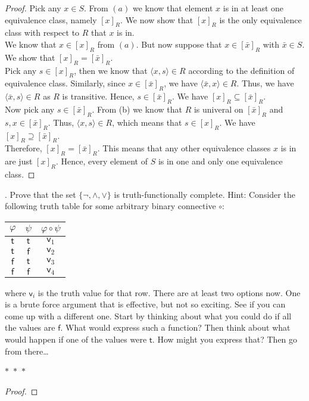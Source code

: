 \documentclass[12pt]{article}
\begin{document}
\begin{proof}
    Pick any $x \in S$. From $(a)$ we know that element $x$ is in at least one equivalence class, 
    namely $[x]_R$. We now show that $[x]_R$ is the only equivalence class with respect to 
    $R$ that $x$ is in.\\
    We know that $x \in [x]_R$ from $(a)$. But now suppose that $x \in [\bar{x}]_R$ with
    $\bar{x} \in S$. We show that $[x]_R = [\bar{x}]_R$.\\
    Pick any $s \in [x]_R$, then we know that $\langle x,s \rangle \in R$ according to the
    definition of equivalence class. Similarly, since $x \in [\bar{x}]_R$, we have 
    $\langle \bar{x}, x \rangle \in R$. Thus, we have $\langle \bar{x}, s \rangle \in R$ 
    as $R$ is transitive.
    Hence, $s \in [\bar{x}]_R$. We have $[x]_R \subseteq [\bar{x}]_R$.\\
    Now pick any $s \in [\bar{x}]_R$. From (b) we know that $R$ is univeral on $[\bar{x}]_R$ and 
    $s, x \in [\bar{x}]_R$. Thus, $\langle x, s \rangle \in R$, which means that 
    $s \in [x]_R$. We have $[x]_R \supseteq [\bar{x}]_R$. \\
    Therefore, $[x]_R = [\bar{x}]_R$. This means that any other equivalence classes $x$ is in
    are just $[x]_R$. Hence, every element of $S$ is in one and only one equivalence class.

\end{proof}

\newpage
{}. Prove that the set $\{\neg, \land, \lor\}$ is truth-functionally complete. Hint:
Consider the following truth table for some arbitrary binary connective $\circ$:
\medskip
\begin{center}
\begin{tabular}{cc|c}
$\varphi$ & $\psi$ & $\varphi \circ \psi$ \\ \hline
$\mathsf{t}$ & $\mathsf{t}$ & $\mathsf{v}_1$ \\
$\mathsf{t}$ & $\mathsf{f}$ & $\mathsf{v}_2$ \\
$\mathsf{f}$ & $\mathsf{t}$ & $\mathsf{v}_3$ \\
$\mathsf{f}$ & $\mathsf{f}$ & $\mathsf{v}_4$ \\
\end{tabular}
\end{center}
\medskip
\noindent
where $\mathsf{v}_i$ is the truth value for that row. There are at least two 
options now.  One is a brute force argument that is effective, but not so exciting.
See if you can come up with a different one. Start by thinking about what you could
do if all the values are $\mathsf{f}$. What would express such a function? Then 
think about what would happen if one of the values were $\mathsf{t}$. How might you
express that? Then go from there\dots
\begin{center}
    $\ast$~$\ast$~$\ast$
\end{center}
\begin{proof}
    
\end{proof}
\end{document}
